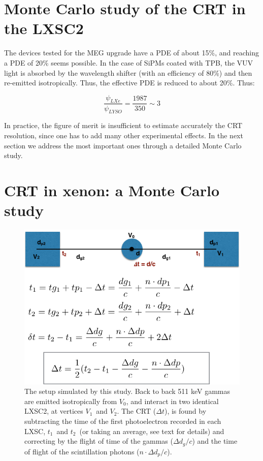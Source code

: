 \documentclass[review]{elsarticle}
\begin{document}
\section{Monte Carlo study of the CRT in the LXSC2} The devices tested for the MEG upgrade have a PDE of about 15\%, and reaching a PDE of 20\% seems possible. In the case of SiPMs coated with TPB, the VUV light is absorbed by the wavelength shifter (with an efficiency of 80\%) and then re-emitted isotropically. Thus, the effective PDE is reduced to about 20\%. Thus:

 \begin{equation}
\frac{\psi_{LXe}}{\psi_{LYSO}} = \frac{1987}{350} \sim 3
\label{eq.ratioScint}
\end{equation}

In practice, the figure of merit is insufficient to estimate accurately the CRT resolution, since one has to add many other experimental effects. In the next section we address the most important ones through a detailed Monte Carlo study. 

\section{CRT in xenon: a Monte Carlo study}
\label{sec.CRT}

\begin{figure}[!bhtp]
	\centering
	\includegraphics[scale=0.6]{../img/TOFSetup.png}
	\caption{\label{fig.scint} The setup simulated by this study. Back to back 511 keV gammas are emitted
	isotropically from $V_0$, and interact in two identical LXSC2, at vertices $V_1$~and
	$V_2$. The CRT ($\Delta t$), is found by subtracting the time of the first photoelectron recorded
	in each LXSC, $t_1$~and $t_2$~(or taking an average, see text for details) and correcting
	by the flight of time of the gammas ($\Delta d_g/c$) and the time of flight of the scintillation photons
	($n \cdot \Delta d_p/c$). }
\end{figure}  
\end{document}
